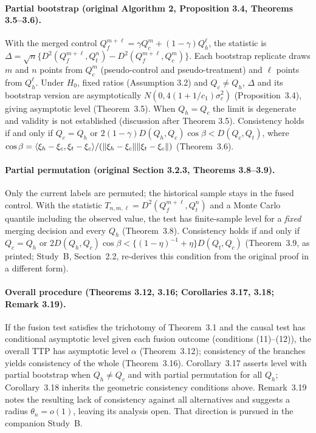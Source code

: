 \documentclass[11pt,a4paper]{article}
\begin{document}
\paragraph{Partial bootstrap (original Algorithm 2, Proposition 3.4, Theorems 3.5--3.6).} With the merged control $Q_f^{m+\ell}=\gamma Q_c^m+(1-\gamma)Q_h^\ell$, the statistic is $\Delta=\sqrt n\{D^2(Q_f^{m+\ell},Q_t^n)-D^2(Q_f^{m+\ell},Q_c^m)\}$. Each bootstrap replicate draws $m$ and $n$ points from $Q_c^m$ (pseudo-control and pseudo-treatment) and $\ell$ points from $Q_h^\ell$. Under $H_0$, fixed ratios (Assumption 3.2) and $Q_c\neq Q_h$, $\Delta$ and its bootstrap version are asymptotically $N(0,4(1+1/c_1)\sigma_c^2)$ (Proposition~3.4), giving asymptotic level (Theorem~3.5). When $Q_h=Q_c$ the limit is degenerate and validity is not established (discussion after Theorem 3.5). Consistency holds if and only if $Q_c=Q_h$ or $2(1-\gamma)D(Q_h,Q_c)\cos\beta<D(Q_c,Q_t)$, where $\cos\beta=\langle \xi_h-\xi_c, \xi_t-\xi_c\rangle/(\lVert \xi_h-\xi_c\rVert\lVert \xi_t-\xi_c\rVert)$ (Theorem~3.6).

\paragraph{Partial permutation (original Section 3.2.3, Theorems 3.8--3.9).} Only the current labels are permuted; the historical sample stays in the fused control. With the statistic $T_{n,m,\ell}=D^2(Q_f^{m+\ell},Q_t^n)$ and a Monte Carlo quantile including the observed value, the test has finite-sample level for a \emph{fixed} merging decision and every $Q_h$ (Theorem~3.8). Consistency holds if and only if $Q_c=Q_h$ or $2D(Q_h,Q_c)\cos\beta<\{(1-\eta)^{-1}+\eta\}D(Q_t,Q_c)$ (Theorem~3.9, as printed; Study~B, Section~2.2, re-derives this condition from the original proof in a different form).

\paragraph{Overall procedure (Theorems 3.12, 3.16; Corollaries 3.17, 3.18; Remark 3.19).} If the fusion test satisfies the trichotomy of Theorem~3.1 and the causal test has conditional asymptotic level given each fusion outcome (conditions (11)--(12)), the overall TTP has asymptotic level $\alpha$ (Theorem~3.12); consistency of the branches yields consistency of the whole (Theorem~3.16). Corollary~3.17 asserts level with partial bootstrap when $Q_h\neq Q_c$ and with partial permutation for all $Q_h$; Corollary~3.18 inherits the geometric consistency conditions above. Remark~3.19 notes the resulting lack of consistency against all alternatives and suggests a radius $\theta_n=o(1)$, leaving its analysis open. That direction is pursued in the companion Study~B.
\end{document}
